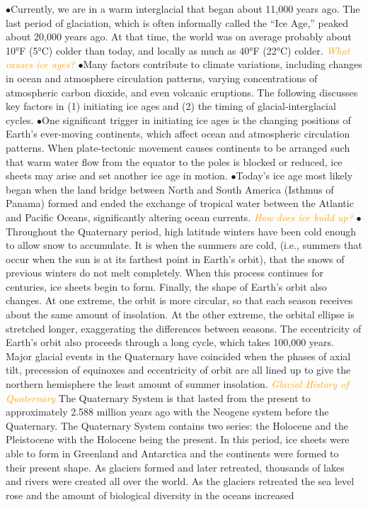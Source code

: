 \documentclass{article}
\newcommand{\ddd}{$\bullet$}
\newcommand{\orange}[1]{\textcolor{orange}{#1}}
\newcommand{\mysub}[1]{{\textit{\orange{#1}}}}
\begin{document}
\begin{multicols*}{4}
                \ddd Currently, we are in a warm interglacial that began about 11,000 years ago. The last period of glaciation, which is often informally called the “Ice Age,” peaked about 20,000 years ago. At that time, the world was on average probably about 10°F (5°C) colder than today, and locally as much as 40°F (22°C) colder.
            \mysub{What causes ice ages?}
                \ddd Many factors contribute to climate variations, including changes in ocean and atmosphere circulation patterns, varying concentrations of atmospheric carbon dioxide, and even volcanic eruptions. The following discusses key factors in (1) initiating ice ages and (2) the timing of glacial-interglacial cycles.
                \ddd One significant trigger in initiating ice ages is the changing positions of Earth’s ever-moving continents, which affect ocean and atmospheric circulation patterns. When plate-tectonic movement causes continents to be arranged such that warm water flow from the equator to the poles is blocked or reduced, ice sheets may arise and set another ice age in motion.
                \ddd Today’s ice age most likely began when the land bridge between North and South America (Isthmus of Panama) formed and ended the exchange of tropical water between the Atlantic and Pacific Oceans, significantly altering ocean currents.
            \mysub{How does ice build up?}
                \ddd Throughout the Quaternary period, high latitude winters have been cold enough to allow snow to accumulate. It is when the summers are cold, (i.e., summers that occur when the sun is at its farthest point in Earth's orbit), that the snows of previous winters do not melt completely. When this process continues for centuries, ice sheets begin to form. Finally, the shape of Earth's orbit also changes. At one extreme, the orbit is more circular, so that each season receives about the same amount of insolation. At the other extreme, the orbital ellipse is stretched longer, exaggerating the differences between seasons. The eccentricity of Earth's orbit also proceeds through a long cycle, which takes 100,000 years. Major glacial events in the Quaternary have coincided when the phases of axial tilt, precession of equinoxes and eccentricity of orbit are all lined up to give the northern hemisphere the least amount of summer insolation.
            \mysub{Glacial History of Quaternary}
                The Quaternary System is that lasted from the present to approximately 2.588 million years ago with the Neogene system before the Quaternary. The Quaternary System contains two series: the Holocene and the Pleistocene with the Holocene being the present. In this period, ice sheets were able to form in Greenland and Antarctica and the continents were formed to their present shape. As glaciers formed and later retreated, thousands of lakes and rivers were created all over the world. As the glaciers retreated the sea level rose and the amount of biological diversity in the oceans increased

\end{multicols*}
\end{document}
